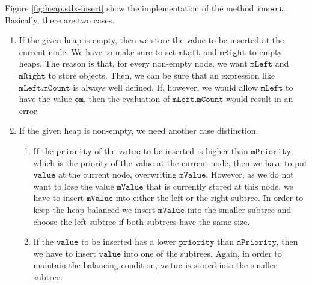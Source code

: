 \noindent
Figure \ref{fig:heap.stlx-insert} show the implementation of the method $\texttt{insert}$.
Basically, there are two cases.
\begin{enumerate}
\item If the given heap is empty, then we store the value to be inserted at the current node.
      We have to make sure to set $\texttt{mLeft}$ and $\texttt{mRight}$ to empty heaps.  The reason is
      that, for every non-empty node, we want $\texttt{mLeft}$ and $\texttt{mRight}$ to store objects.
      Then, we can be sure that an expression like $\texttt{mLeft}.\texttt{mCount}$ is always well defined.
      If, however, we would allow $\texttt{mLeft}$ to have the value $\texttt{om}$, then the evaluation
      of $\texttt{mLeft}.\texttt{mCount}$ would result in an error.
\item If the given heap is non-empty, we need another case distinction.
  \begin{enumerate}
  \item If the $\texttt{priority}$ of the $\texttt{value}$ to be inserted is higher than
        $\texttt{mPriority}$, which is the priority of the value at the current node, then we have to 
        put $\texttt{value}$ at the current node, overwriting $\texttt{mValue}$.  However, as we do not want
        to lose the value $\texttt{mValue}$ that is currently stored at this node, we have to insert 
        $\texttt{mValue}$ into either the left or the right subtree.  In order to keep the heap
        balanced we insert $\texttt{mValue}$ into the smaller subtree and choose the left subtree if
        both subtrees have the same size.
  \item If the $\texttt{value}$ to be inserted has a lower $\texttt{priority}$ than $\texttt{mPriority}$, then we have
        to insert $\texttt{value}$ into one of the subtrees.  Again, in order to maintain the balancing
        condition, $\texttt{value}$ is stored into the smaller subtree.
  \end{enumerate}
\end{enumerate}

